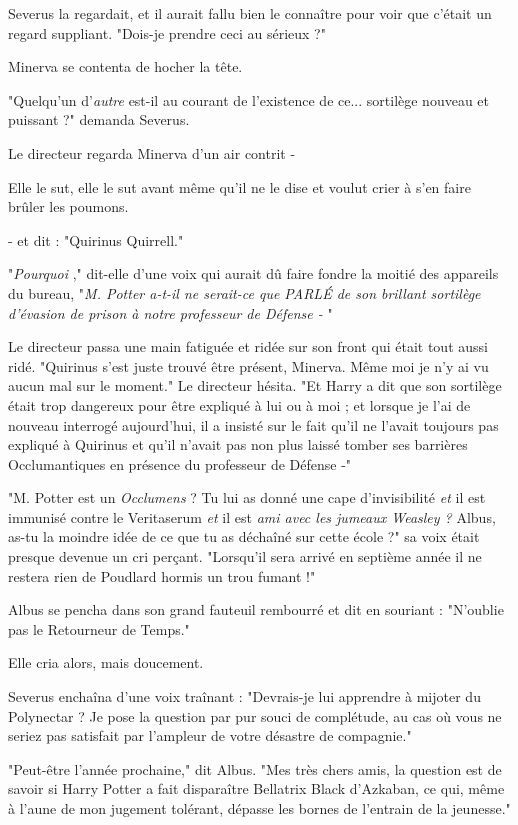 Severus la regardait, et il aurait fallu bien le connaître pour voir que c'était un regard suppliant. "Dois-je prendre ceci au sérieux ?"

Minerva se contenta de hocher la tête.

"Quelqu'un d'\emph{autre}  est-il au courant de l'existence de ce... sortilège nouveau et puissant ?" demanda Severus.

Le directeur regarda Minerva d'un air contrit -

Elle le sut, elle le sut avant même qu'il ne le dise et voulut crier à s'en faire brûler les poumons.

- et dit : "Quirinus Quirrell."

"\emph{Pourquoi} ," dit-elle d'une voix qui aurait dû faire fondre la moitié des appareils du bureau, "\emph{M. Potter a-t-il ne serait-ce que PARLÉ de son brillant sortilège d'évasion de prison à notre professeur de Défense -} "

Le directeur passa une main fatiguée et ridée sur son front qui était tout aussi ridé. "Quirinus s'est juste trouvé être présent, Minerva. Même moi je n'y ai vu aucun mal sur le moment." Le directeur hésita. "Et Harry a dit que son sortilège était trop dangereux pour être expliqué à lui ou à moi ; et lorsque je l'ai de nouveau interrogé aujourd'hui, il a insisté sur le fait qu'il ne l'avait toujours pas expliqué à Quirinus et qu'il n'avait pas non plus laissé tomber ses barrières Occlumantiques en présence du professeur de Défense -"

"M. Potter est un \emph{Occlumens}  ? Tu lui as donné une cape d'invisibilité \emph{et}  il est immunisé contre le Veritaserum \emph{et}  il est\emph{ ami avec les jumeaux Weasley ?}  Albus, as-tu la moindre idée de ce que tu as déchaîné sur cette école ?" sa voix était presque devenue un cri perçant. "Lorsqu'il sera arrivé en septième année il ne restera rien de Poudlard hormis un trou fumant !"

Albus se pencha dans son grand fauteuil rembourré et dit en souriant : "N'oublie pas le Retourneur de Temps."

Elle cria alors, mais doucement.

Severus enchaîna d'une voix traînant : "Devrais-je lui apprendre à mijoter du Polynectar ? Je pose la question par pur souci de complétude, au cas où vous ne seriez pas satisfait par l'ampleur de votre désastre de compagnie."

"Peut-être l'année prochaine," dit Albus. "Mes très chers amis, la question est de savoir si Harry Potter a fait disparaître Bellatrix Black d'Azkaban, ce qui, même à l'aune de mon jugement tolérant, dépasse les bornes de l'entrain de la jeunesse."

